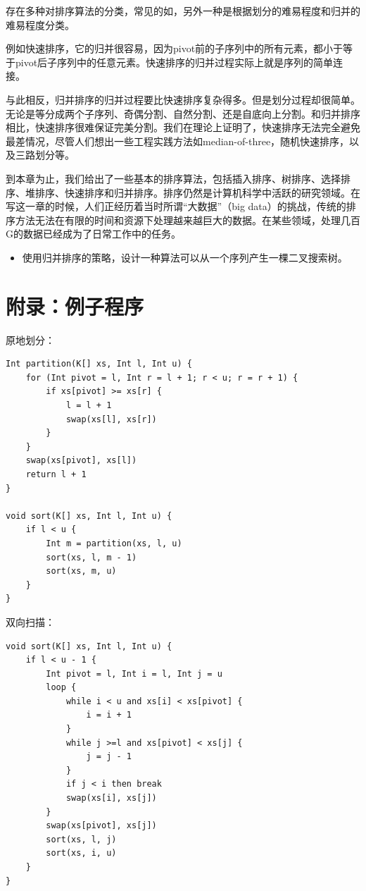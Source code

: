 \documentclass[b5paper]{ctexart}
\begin{document}
存在多种对排序算法的分类，常见的如\cite{TAOCP}，另外一种是根据划分的难易程度和归并的难易程度分类\cite{algo-fp}。

例如快速排序，它的归并很容易，因为pivot前的子序列中的所有元素，都小于等于pivot后子序列中的任意元素。快速排序的归并过程实际上就是序列的简单连接。

与此相反，归并排序的归并过程要比快速排序复杂得多。但是划分过程却很简单。无论是等分成两个子序列、奇偶分割、自然分割、还是自底向上分割。和归并排序相比，快速排序很难保证完美分割。我们在理论上证明了，快速排序无法完全避免最差情况，尽管人们想出一些工程实践方法如median-of-three，随机快速排序，以及三路划分等。

到本章为止，我们给出了一些基本的排序算法，包括插入排序、树排序、选择排序、堆排序、快速排序和归并排序。排序仍然是计算机科学中活跃的研究领域。在写这一章的时候，人们正经历着当时所谓“大数据”（big data）的挑战，传统的排序方法无法在有限的时间和资源下处理越来越巨大的数据。在某些领域，处理几百G的数据已经成为了日常工作中的任务。

\begin{Exercise}
  \begin{itemize}
    \item 使用归并排序的策略，设计一种算法可以从一个序列产生一棵二叉搜索树。
  \end{itemize}
\end{Exercise}

\section{附录：例子程序}

原地划分：

\begin{lstlisting}[language = Bourbaki]
Int partition(K[] xs, Int l, Int u) {
    for (Int pivot = l, Int r = l + 1; r < u; r = r + 1) {
        if xs[pivot] >= xs[r] {
            l = l + 1
            swap(xs[l], xs[r])
        }
    }
    swap(xs[pivot], xs[l])
    return l + 1
}

void sort(K[] xs, Int l, Int u) {
    if l < u {
        Int m = partition(xs, l, u)
        sort(xs, l, m - 1)
        sort(xs, m, u)
    }
}
\end{lstlisting}

双向扫描：

\begin{lstlisting}[language = Bourbaki]
void sort(K[] xs, Int l, Int u) {
    if l < u - 1 {
        Int pivot = l, Int i = l, Int j = u
        loop {
            while i < u and xs[i] < xs[pivot] {
                i = i + 1
            }
            while j >=l and xs[pivot] < xs[j] {
                j = j - 1
            }
            if j < i then break
            swap(xs[i], xs[j])
        }
        swap(xs[pivot], xs[j])
        sort(xs, l, j)
        sort(xs, i, u)
    }
}
\end{lstlisting}
\end{document}
